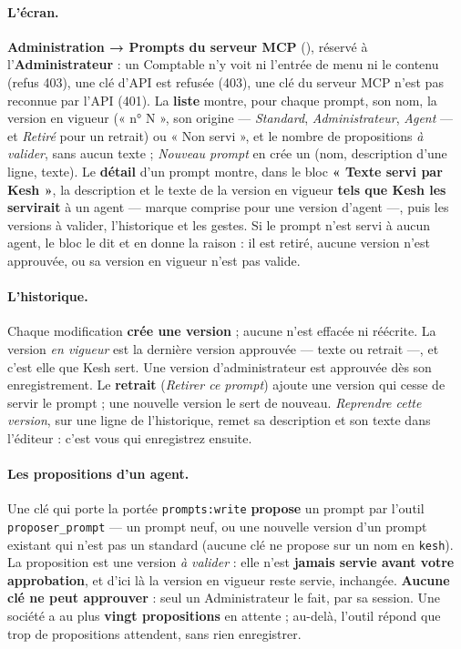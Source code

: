 \documentclass[a4paper,11pt,oneside]{article}
\begin{document}
\paragraph{L'écran.} \textbf{Administration → Prompts du serveur MCP} (), réservé à l'\textbf{Administrateur} : un Comptable n'y voit ni l'entrée de menu ni le contenu (refus 403), une clé d'API est refusée (403), une clé du serveur MCP n'est pas reconnue par l'API (401). La \textbf{liste} montre, pour chaque prompt, son nom, la version en vigueur (« n° N », son origine --- \emph{Standard}, \emph{Administrateur}, \emph{Agent} --- et \emph{Retiré} pour un retrait) ou « Non servi », et le nombre de propositions \emph{à valider}, sans aucun texte ; \emph{Nouveau prompt} en crée un (nom, description d'une ligne, texte). Le \textbf{détail} d'un prompt montre, dans le bloc \textbf{« Texte servi par Kesh »}, la description et le texte de la version en vigueur \textbf{tels que Kesh les servirait} à un agent --- marque comprise pour une version d'agent ---, puis les versions à valider, l'historique et les gestes. Si le prompt n'est servi à aucun agent, le bloc le dit et en donne la raison : il est retiré, aucune version n'est approuvée, ou sa version en vigueur n'est pas valide.

\paragraph{L'historique.} Chaque modification \textbf{crée une version} ; aucune n'est effacée ni réécrite. La version \emph{en vigueur} est la dernière version approuvée --- texte ou retrait ---, et c'est elle que Kesh sert. Une version d'administrateur est approuvée dès son enregistrement. Le \textbf{retrait} (\emph{Retirer ce prompt}) ajoute une version qui cesse de servir le prompt ; une nouvelle version le sert de nouveau. \emph{Reprendre cette version}, sur une ligne de l'historique, remet sa description et son texte dans l'éditeur : c'est vous qui enregistrez ensuite.

\paragraph{Les propositions d'un agent.} Une clé qui porte la portée \texttt{prompts:write} \textbf{propose} un prompt par l'outil \texttt{proposer\_prompt} --- un prompt neuf, ou une nouvelle version d'un prompt existant qui n'est pas un standard (aucune clé ne propose sur un nom en \texttt{kesh}). La proposition est une version \emph{à valider} : elle n'est \textbf{jamais servie avant votre approbation}, et d'ici là la version en vigueur reste servie, inchangée. \textbf{Aucune clé ne peut approuver} : seul un Administrateur le fait, par sa session. Une société a au plus \textbf{vingt propositions} en attente ; au-delà, l'outil répond que trop de propositions attendent, sans rien enregistrer.
\end{document}
